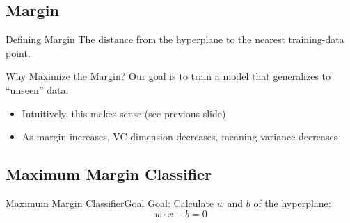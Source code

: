 \documentclass[xcolor=dvipsnames]{beamer}
\begin{document}
\subsection{Margin}

\begin{frame}{Defining Margin}
    The distance from the hyperplane to the nearest training-data point.\\
\end{frame}

\begin{frame}{Why Maximize the Margin?}
    Our goal is to train a model that generalizes to ``unseen'' data. \\
    \vspace{1em}
    \vspace{1em}
    \begin{itemize}
        \item<3-> Intuitively, this makes sense (see previous slide)
        \item<4-> As margin increases, VC-dimension decreases, meaning variance decreases
    \end{itemize}
\end{frame}

\subsection{Maximum Margin Classifier}

\begin{frame}{Maximum Margin Classifier}{Goal}
    Goal: Calculate $w$ and $b$ of the hyperplane:
    $$w \cdotp x - b = 0$$
    \vspace{3em}
\end{frame}
\end{document}
